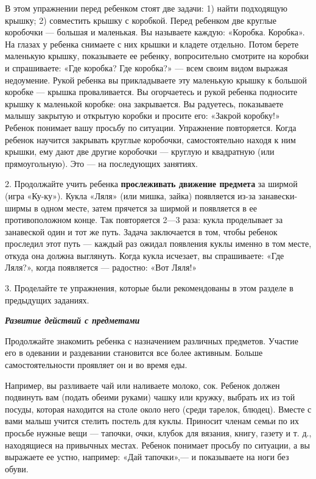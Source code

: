 \documentclass[a5paper]{book}
\renewcommand{\emph}[1]{\textit{#1}}
\begin{document}
В этом упражнении перед ребенком стоят две задачи: 1) найти подходящую
крышку; 2) совместить крышку с коробкой. Перед ребенком две круглые
коробочки --- большая и маленькая. Вы называете каждую: «Коробка.
Коробка». На глазах у ребенка снимаете с них крышки и кладете отдельно.
Потом берете маленькую крышку, показываете ее ребенку, вопросительно
смотрите на коробки и спрашиваете: «Где коробка? Где коробка?» --- всем
своим видом выражая недоумение. Рукой ребенка вы прикладываете эту
маленькую крышку к большой коробке --- крышка проваливается. Вы
огорчаетесь и рукой ребенка подносите крышку к маленькой коробке: она
закрывается. Вы радуетесь, показываете малышу закрытую и открытую
коробки и просите его: «Закрой коробку!» Ребенок понимает вашу просьбу
по ситуации. Упражнение повторяется. Когда ребенок научится закрывать
круглые коробочки, самостоятельно находя к ним крышки, ему дают две
другие коробочки --- круглую и квадратную (или прямоугольную). Это ---
на последующих занятиях.

2. Продолжайте учить ребенка \textbf{прослеживать движение предмета} за
ширмой (игра «Ку-ку»). Кукла «Ляля» (или мишка, зайка) появляется из-за
занавески-ширмы в одном месте, затем прячется за ширмой и появляется в
ее противоположном конце. Так повторяется 2---3 раза: кукла проделывает
за занавеской один и тот же путь. Задача заключается в том, чтобы
ребенок проследил этот путь --- каждый раз ожидал появления куклы именно
в том месте, откуда она должна выглянуть. Когда кукла исчезает, вы
спрашиваете: «Где Ляля?», когда появляется --- радостно: «Вот Ляля!»

3. Проделайте те упражнения, которые были рекомендованы в этом разделе в
предыдущих заданиях.

\emph{\textbf{Развитие действий с предметами}}

Продолжайте знакомить ребенка с назначением различных предметов. Участие
его в одевании и раздевании становится все более активным. Больше
самостоятельности проявляет он и во время еды.

Например, вы разливаете чай или наливаете молоко, сок. Ребенок должен
подвинуть вам (подать обеими руками) чашку или кружку, выбрать их из той
посуды, которая находится на столе около него (среди тарелок, блюдец).
Вместе с вами малыш учится стелить постель для куклы. Приносит членам
семьи по их просьбе нужные вещи --- тапочки, очки, клубок для вязания,
книгу, газету и т. д., находящиеся на привычных местах. Ребенок понимает
просьбу по ситуации, а вы выражаете ее устно, например: «Дай
тапочки»,--- и показываете на ноги без обуви.
\end{document}
